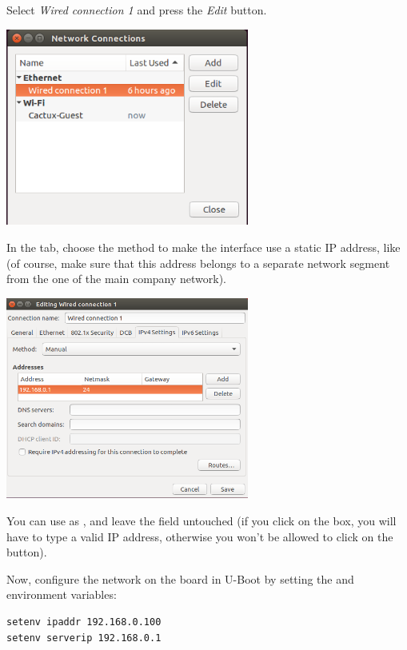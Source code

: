 Select {\em Wired connection 1} and press the {\em Edit} button.

\begin{center}
\includegraphics[width=8cm]{labs/sysdev-u-boot/network-config-2.png}
\end{center}

In the  tab, choose the  method
to make the interface use a static IP address, like 
(of course, make sure that this address belongs to a separate network
segment from the one of the main company network).

\begin{center}
\includegraphics[width=8cm]{labs/sysdev-u-boot/network-config-3.png}
\end{center}

You can use  as , and leave the
 field untouched (if you click on the  box, you
will have to type a valid IP address, otherwise you won't be allowed to
click on the  button).

Now, configure the network on the board in U-Boot by setting the 
and  environment variables:

\begin{verbatim}
setenv ipaddr 192.168.0.100
setenv serverip 192.168.0.1
\end{verbatim}

